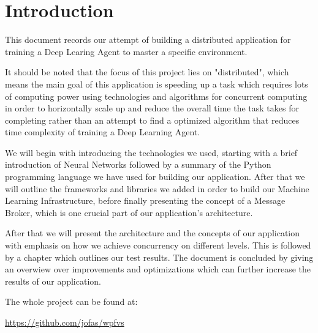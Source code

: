 \section{Introduction}

This document records our attempt of building a distributed
application for training a Deep Learing Agent to master a
specific environment.

It should be noted that the focus of this project lies on
"distributed", which means the main goal of this
application is speeding up a task which requires lots of
computing power using technologies and algorithms for
concurrent computing in order to horizontally scale up and
reduce the overall time the task takes for completing
rather than an attempt to find a optimized algorithm that
reduces time complexity of training a Deep Learning Agent.

We will begin with introducing the technologies we used,
starting with a brief introduction of Neural Networks
followed by a summary of the Python programming language
we have used for building our application. After that we
will outline the frameworks and libraries we added in
order to build our Machine Learning Infrastructure, before
finally presenting the concept of a Message Broker, which
is one crucial part of our application's architecture.

After that we will present the architecture and the
concepts of our application with emphasis on how we
achieve concurrency on different levels. This is followed
by a chapter which outlines our test results. The document
is concluded by giving an overwiew over improvements and
optimizations which can further increase the results of our
application.

The whole project can be found at:
\begin{center}
  \url{https://github.com/jofas/wpfvs}
\end{center}
